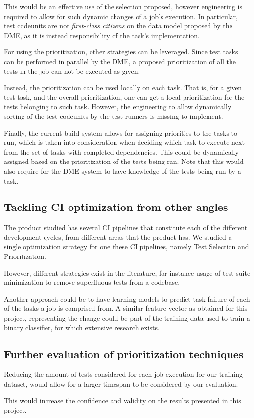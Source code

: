 This would be an effective use of the selection proposed, however engineering is required
to allow for such dynamic changes of a job's execution. In particular, test codeunits
are not \emph{first-class citizens} on the data model proposed by the DME, as
it is instead responsibility of the task's implementation.

For using the prioritization, other strategies can be leveraged. Since test tasks 
can be performed in parallel by the DME, a proposed prioritization of all the 
tests in the job can not be executed as given. 

Instead, the prioritization can be used locally on each task. That is, for a given
test task, and the overall prioritization, one can get a local prioritization for the
tests belonging to such task. However, the engineering to allow dynamically sorting of the test 
codeunits by the test runners is missing to implement.

Finally, the current build system allows for assigning priorities to the tasks to run,
which is taken into consideration when deciding which task to execute next from the 
set of tasks with completed dependencies. This could be dynamically assigned based on 
the prioritization of the tests being ran. Note that this would also require for the
DME system to have knowledge of the tests being run by a task.

\subsection{Tackling CI optimization from other angles}
The product studied has several CI pipelines that constitute each of the different
development cycles, from different areas that the product has. We studied a single
optimization strategy for one these CI pipelines, namely Test Selection and Prioritization.

However, different strategies exist in the literature, for instance usage of
test suite minimization to remove superfluous tests from a codebase.

Another approach could be to have learning models to predict task failure
of each of the tasks a job is comprised from. A similar feature vector as
obtained for this project, representing the change could be part of the training 
data used to train a binary classifier, for which extensive research exists.

\subsection{Further evaluation of prioritization techniques}
Reducing the amount of tests considered for each job execution for our training
dataset, would allow for a larger timespan to be considered by our evaluation.

This would increase the confidence and validity on the results presented in this project.
